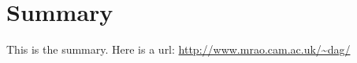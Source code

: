 \chapter*{Summary}


This is the summary.
%
Here is a url: \url{http://www.mrao.cam.ac.uk/~dag/}

\cleardoublepage{}
